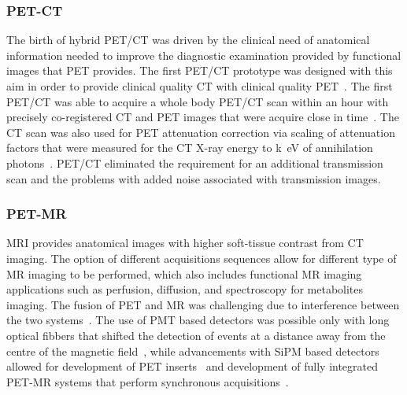 \subsubsection{PET-CT}
The birth of hybrid PET/CT was driven by the clinical need of anatomical information needed to improve the diagnostic examination provided by functional images that PET provides. The first PET/CT prototype was designed with this aim in order to provide clinical quality CT with clinical quality PET~\cite{Townsend2008}. The first PET/CT was able to acquire a whole body PET/CT scan within an hour with precisely co-registered CT and PET images that were acquire close in time~\cite{Beyer2000}. The CT scan was also used for PET attenuation correction via scaling of attenuation factors that were measured for the CT X-ray energy to \si{k\electronvolt} of annihilation photons~\cite{Kinahan1998}. PET/CT eliminated the requirement for an additional transmission scan and the problems with added noise associated with transmission images. 

\subsubsection{PET-MR}
MRI provides anatomical images with higher soft-tissue contrast from CT imaging. The option of different acquisitions sequences allow for different type of MR imaging to be performed, which also includes functional MR imaging applications such as perfusion, diffusion, and spectroscopy for metabolites imaging. 
The fusion of PET and MR was challenging due to interference between the two systems~\cite{Disselhorst2014}. The use of PMT based detectors was possible only with long optical fibbers that shifted the detection of events at a distance away from the centre of the magnetic field~\cite{Shao1997,Mackewn2010}, while advancements with SiPM based detectors allowed for development of PET inserts~\cite{Kolb2012} and development of fully integrated PET-MR systems that perform synchronous acquisitions~\cite{Delso2011,Grant2016,Levin2016}.


